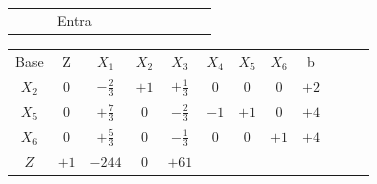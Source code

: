 \begin{frame}
{\begin{table}
\begin{tabular}{c c c c c c c c c c c c}
				& & & \scriptsize Entra \\ 
			\end{tabular}
		\end{table}			
	}
	{
		\begin{table}		
			\begin{tabular}{c c c c c c c c c c c c}
				\cellcolor{blue!100} \color{white} \scriptsize Base 
				&\cellcolor{blue!100} \color{white} \scriptsize Z 
				&\cellcolor{blue!100} \color{white} $\scriptstyle X_1$ 
				&\cellcolor{blue!100} \color{red} $\scriptstyle X_2$ 
				&\cellcolor{blue!100} \color{white}   $\scriptstyle X_3$ 
				&\cellcolor{blue!100} \color{white} $\scriptstyle X_4$ 
				&\cellcolor{blue!100} \color{red}   $\scriptstyle X_5$ 
				&\cellcolor{blue!100} \color{red}   $\scriptstyle X_6$ 
				&\cellcolor{blue!100} \color{white} \scriptsize b
				&
				&
				& \\
				\cellcolor{blue!100} \color{red} $\scriptstyle X_2$
				& \cellcolor{yellow!50} $\scriptstyle 0$
				& \cellcolor{yellow!50} $\scriptstyle -\frac{2}{3}$
				& \cellcolor{yellow!50} $\scriptstyle +1$
				& \cellcolor{yellow!50} $\scriptstyle +\frac{1}{3}$
				& \cellcolor{yellow!50} $\scriptstyle 0$
				& \cellcolor{yellow!50} $\scriptstyle 0$
				& \cellcolor{yellow!50} $\scriptstyle 0$
				& \cellcolor{yellow!50} $\scriptstyle +2$ \\
			    \cellcolor{blue!100} \color{red} $\scriptstyle X_5$
				& \cellcolor{yellow!50} $\scriptstyle 0$
				& \cellcolor{yellow!50} $\scriptstyle +\frac{7}{3}$
				& \cellcolor{yellow!50} $\scriptstyle 0$
				& \cellcolor{yellow!50} $\scriptstyle -\frac{2}{3}$			
				& \cellcolor{yellow!50} $\scriptstyle -1$
				& \cellcolor{yellow!50} $\scriptstyle +1$
				& \cellcolor{yellow!50} $\scriptstyle 0$ 
				& \cellcolor{yellow!50} $\scriptstyle +4$ \\
				\cellcolor{blue!100} \color{red} $\scriptstyle X_6$
				& \cellcolor{yellow!50} $\scriptstyle 0$
				& \cellcolor{yellow!50} $\scriptstyle +\frac{5}{3}$
				& \cellcolor{yellow!50} $\scriptstyle 0$
				& \cellcolor{yellow!50} $\scriptstyle -\frac{1}{3}$
				& \cellcolor{yellow!50} $\scriptstyle 0$
				& \cellcolor{yellow!50} $\scriptstyle 0$
				& \cellcolor{yellow!50} $\scriptstyle +1$
				& \cellcolor{yellow!50} $\scriptstyle +4$ \\
				\cellcolor{blue!100} \color{white} $\scriptstyle Z$
				& \cellcolor{yellow!50} $\scriptstyle +1$
				& \cellcolor{yellow!50} $\scriptstyle -244$
				& \cellcolor{yellow!50} $\scriptstyle 0$
				& \cellcolor{yellow!50} $\scriptstyle +61$

\end{tabular}
\end{table}}
\end{frame}
